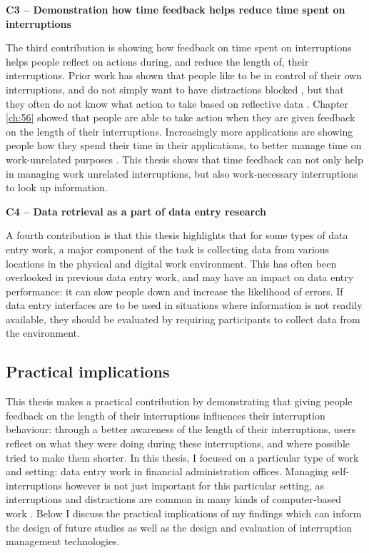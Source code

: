 \textbf{C3 – Demonstration how time feedback helps reduce time spent on interruptions}

The third contribution is showing how feedback on time spent on interruptions helps people reflect on actions during, and reduce the length of, their interruptions. Prior work has shown that people like to be in control of their own interruptions, and do not simply want to have distractions blocked \citep{Mark2018}, but that they often do not know what action to take based on reflective data \citep{Collins2014, Whittaker2016}. Chapter \ref{ch:56} showed that people are able to take action when they are given feedback on the length of their interruptions. Increasingly more applications are showing people how they spend their time in their applications, to better manage time on work-unrelated purposes \citep{Constine2018, Constine2018a, Lynley2018}. This thesis shows that time feedback can not only help in managing work unrelated interruptions, but also work-necessary interruptions to look up information.

\textbf{C4 – Data retrieval as a part of data entry research}

A fourth contribution is that this thesis highlights that for some types of data entry work, a major component of the task is collecting data from various locations in the physical and digital work environment. This has often been overlooked in previous data entry work, and may have an impact on data entry performance: it can slow people down and increase the likelihood of errors. If data entry interfaces are to be used in situations where information is not readily available, they should be evaluated  by requiring participants to collect data from the environment.

\subsection{Practical implications}
This thesis makes a practical contribution by demonstrating that giving people feedback on the length of their interruptions influences their interruption behaviour: through a better awareness of the length of their interruptions, users reflect on what they were doing during these interruptions, and where possible tried to make them shorter. In this thesis, I focused on a particular type of work and setting: data entry work in financial administration offices. Managing self-interruptions however is not just important for this particular setting, as interruptions and distractions are common in many kinds of computer-based work \citep{Gonzalez2004}. Below I discuss the practical implications of my findings which can inform the design of future studies as well as the design and evaluation of interruption management technologies. 

